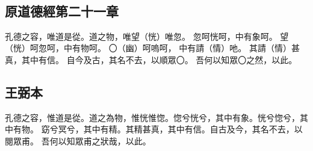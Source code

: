 ﻿%
%

\chapter{~}

\section{原道德經第二十一章}

\begin{withgezhu}

\zhsong


孔德之容，唯道是從。道之物，唯望（\textcolor{tongjia-color}{恍}）唯忽。
\colorbox{adding-color}{忽}\colorbox{adding-color}{呵恍}呵，中有象呵。
望（\textcolor{tongjia-color}{恍}）呵忽呵，中有物呵。
〇（\textcolor{tongjia-color}{幽}）呵嗚呵，
中有請（\textcolor{tongjia-color}{情}）吔。
其請（\textcolor{tongjia-color}{情}）甚真，其中\colorbox{adding-color}{有信}。
自今及古，其名不去，以順眾〇。
吾何以知眾〇之然，以此。

\end{withgezhu}

\section{王弼本}

\begin{withgezhu}

\zhsong

孔德之容，惟道是從。道之為物，惟恍惟惚。惚兮恍兮，其中有象。恍兮惚兮，其中有物。
窈兮冥兮，其中有精。其精甚真，其中有信。自古及今，其名不去，以閱眾甫。
吾何以知眾甫之狀哉，以此。

\end{withgezhu}
